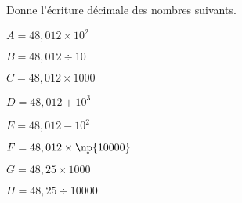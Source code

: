 
Donne l'écriture décimale des nombres suivants.

\begin{description}
\begin{minipage}{0.48\linewidth}
\item $A=48,012 \times 10^2$
\item $B=48,012 \div 10$
\item $C=48,012 \times 1000$
\item $D=48,012 + 10^3$
\end{minipage}
\hfill
\begin{minipage}{0.48\linewidth}
\item $E=48,012 - 10^2$
\item $F=48,012 \times \np{10000}$
\item  $G=48,25 \times 1000$
\item  $H=48,25 \div 10000$
\end{minipage}
\end{description}